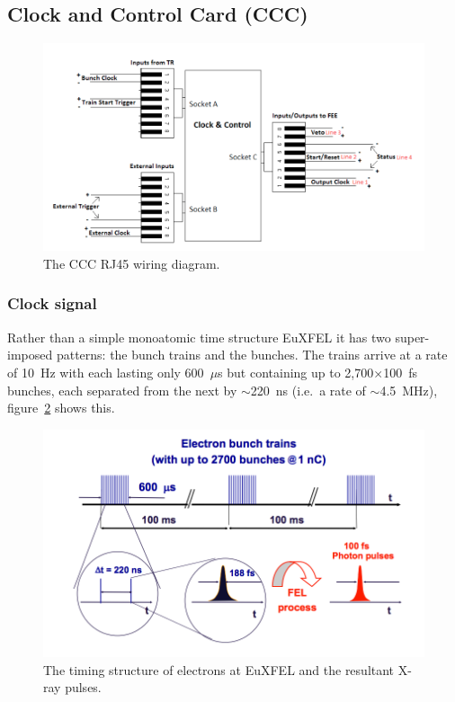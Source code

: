 \subsection{Clock and Control Card (CCC)} %
\label{sub:clock_and_control_card}
\begin{figure}[h]
  \centering
    \includegraphics[width=.9\textwidth]{appendix_XFEL/images/Other/CCC_RJ45_diagram.png}
  \caption{The CCC RJ45 wiring diagram.}
  \label{fig:CCC_RJ45_diagram}
\end{figure}

\subsubsection{Clock signal} %
\label{sub:clock_signal}
Rather than a simple monoatomic time structure EuXFEL it has two super-imposed patterns: the bunch trains and the bunches. The trains arrive at a rate of 10~Hz with each lasting only 600~\(\mu\)s but containing up to 2,700\( \times\)100~fs bunches, each separated from the next by \(\sim\)220~ns (i.e.\ a rate of \(\sim\)4.5~MHz), figure~\ref{fig:XFEL-time_structure} shows this.
\begin{figure}[h]
  \centering
    \includegraphics[width=.9\textwidth]{appendix_XFEL/images/Other/XFEL-time_structure.png}
  \caption{The timing structure of electrons at EuXFEL and the resultant X-ray pulses. }
  \label{fig:XFEL-time_structure}
\end{figure}

